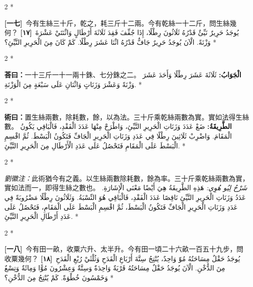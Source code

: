 \documentclass[11pt,a4paper]{article}
\newcommand{\ar}[1]{\arabicfont\beginR #1\endR}
\newcommand{\problemnum}[1]{\textbf{[\ignorespaces#1\unskip]}}
\newenvironment{bilingual}{%
  \begin{paracol}{2}%
  \switchcolumn[0]*%
}{%
  \end{paracol}%
}
\newcommand{\cnline}[1]{\switchcolumn[0]\noindent #1 \switchcolumn[1]}
\newcommand{\arline}[1]{\noindent\ar{#1} \switchcolumn[0]*}
\newenvironment{prob bilingual}{%
  \begin{paracol}{2}%
  \switchcolumn[0]*%
}{%
  \end{paracol}%
  \vspace{0.3em}%
}
\begin{document}
\begin{bilingual}
\cnline{\problemnum{一七}\, 今有生絲三十斤，乾之，耗三斤十二兩。今有乾絲一十二斤，問生絲幾何？}
\arline{\problemnum{١٧}\, يُوجَدُ حَرِيرٌ نَيِّئٌ قَدْرُهُ ثَلَاثُونَ رِطْلًا، إِذَا جُفِّفَ فَقِدَ ثَلَاثَةَ أَرْطَالٍ وَاثْنَتَيْ عَشْرَةَ وَزْنَةً. الْآنَ يُوجَدُ حَرِيرٌ جَافٌّ قَدْرُهُ اثْنَا عَشَرَ رِطْلًا. كَمْ كَانَ مِنَ الْحَرِيرِ النَّيِّئِ؟}
\end{bilingual}

\begin{bilingual}
\cnline{\textcolor{answercolor}{\textbf{荅曰：}}一十三斤一十一兩十銖、七分銖之二。}
\arline{\textcolor{answercolor}{\textbf{الْجَوَابُ:}} ثَلَاثَةَ عَشَرَ رِطْلًا وَأَحَدَ عَشَرَ وَزْنَةً وَعَشْرَ وَزَنَاتٍ وَاثْنَانِ عَلَى سَبْعَةٍ مِنَ الْوَزْنَةِ.}
\end{bilingual}

\begin{bilingual}
\cnline{%
\textcolor{methodcolor}{\textbf{術曰：}}置生絲兩數，除耗數，餘，以為法。三十斤乘乾絲兩數為實。實如法得生絲數。
}
\arline{%
\textcolor{methodcolor}{\textbf{الطَّرِيقَةُ:}} ضَعْ عَدَدَ وَزَنَاتِ الْحَرِيرِ النَّيِّئِ، وَاطْرَحْ مِنْهَا عَدَدَ الْفَقْدِ، فَالْبَاقِي يَكُونُ الْمَقَامَ. وَاضْرِبْ ثَلَاثِينَ رِطْلًا فِي عَدَدِ وَزَنَاتِ الْحَرِيرِ الْجَافِّ فَتَكُونُ الْبَسْطَ. ثُمَّ اقْسِمِ الْبَسْطَ عَلَى الْمَقَامِ فَتَحْصُلُ عَلَى عَدَدِ الْأَرْطَالِ مِنَ الْحَرِيرِ النَّيِّئِ.
}
\end{bilingual}

\begin{bilingual}
\cnline{%
\textcolor{commentarycolor}{\small\textit{劉徽注：}}此術猶今有之義。以生絲兩數除耗數，餘為率。三十斤乘乾絲兩數為實，實如法而一，即得生絲之數也。
}
\arline{%
\textcolor{commentarycolor}{\small\textit{شَرْحُ لِيُو هُوِي:}} هَذِهِ الطَّرِيقَةُ هِيَ أَيْضًا مَعْنَى الْإِشَارَةِ. عَدَدُ وَزَنَاتِ الْحَرِيرِ النَّيِّئِ نَاقِصًا عَدَدَ الْفَقْدِ، فَالْبَاقِي هُوَ النِّسْبَةُ. وَثَلَاثُونَ رِطْلًا مَضْرُوبَةً فِي عَدَدِ وَزَنَاتِ الْحَرِيرِ الْجَافِّ فَتَكُونُ الْبَسْطَ، ثُمَّ اقْسِمِ الْبَسْطَ عَلَى الْمَقَامِ، فَتَحْصُلُ عَلَى عَدَدِ أَرْطَالِ الْحَرِيرِ النَّيِّئِ.
}
\end{bilingual}

\begin{bilingual}
\cnline{\problemnum{一八}\, 今有田一畝，收粟六升、太半升。今有田一頃二十六畝一百五十九步，問收粟幾何？}
\arline{\problemnum{١٨}\, يُوجَدُ حَقْلٌ مِسَاحَتُهُ مُوّ وَاحِدٌ، يُنْتِجُ سِتَّةَ أَرْبَاعِ الْقَدَحِ وَثُلْثَيْ رُبْعِ الْقَدَحِ مِنَ الدُّخْنِ. الْآنَ يُوجَدُ حَقْلٌ مِسَاحَتُهُ قَرْيَةٌ وَاحِدَةٌ وَسِتَّةٌ وَعِشْرُونَ مُوًّا وَمِائَةٌ وَتِسْعٌ وَخَمْسُونَ خُطْوَةً. كَمْ يُنْتِجُ مِنَ الدُّخْنِ؟}
\end{bilingual}
\end{document}
